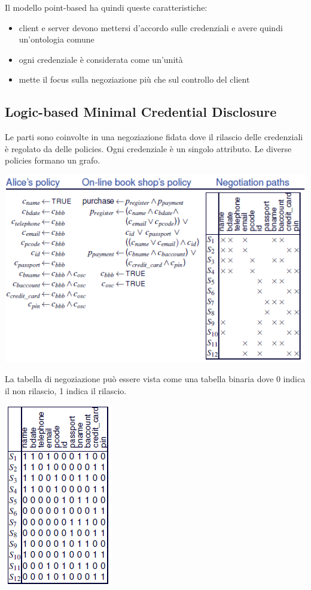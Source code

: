 Il modello point-based ha quindi queste caratteristiche:
\begin{itemize}
    \item client e server devono mettersi d'accordo sulle credenziali e avere quindi un'ontologia comune
    \item ogni credenziale è considerata come un'unità
    \item mette il focus sulla negoziazione più che sul controllo del client
\end{itemize}

\subsection{Logic-based Minimal Credential Disclosure}
Le parti sono coinvolte in una negoziazione fidata dove il rilascio delle credenziali è regolato da delle policies. Ogni credenziale è un singolo attributo. Le diverse policies formano un grafo.
\begin{center}
    \includegraphics[scale=0.6]{img/logic.png}
\end{center}
La tabella di negoziazione può essere vista come una tabella binaria dove 0 indica il non rilascio, 1 indica il rilascio.\\
\begin{center}
    \includegraphics[scale=0.6]{img/logbin.png}
\end{center}
